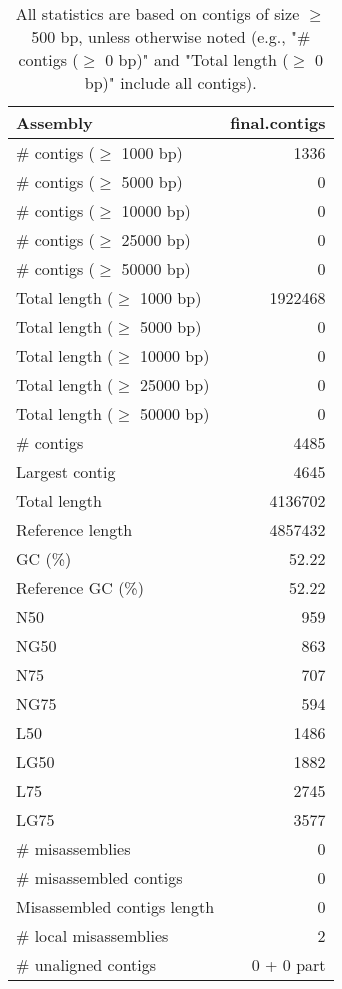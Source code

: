 \documentclass[12pt,a4paper]{article}
\begin{document}
\begin{table}[ht]
\begin{center}
\caption{All statistics are based on contigs of size $\geq$ 500 bp, unless otherwise noted (e.g., "\# contigs ($\geq$ 0 bp)" and "Total length ($\geq$ 0 bp)" include all contigs).}
\begin{tabular}{|l*{1}{|r}|}
\hline
Assembly & final.contigs \\ \hline
\# contigs ($\geq$ 1000 bp) & 1336 \\ \hline
\# contigs ($\geq$ 5000 bp) & 0 \\ \hline
\# contigs ($\geq$ 10000 bp) & 0 \\ \hline
\# contigs ($\geq$ 25000 bp) & 0 \\ \hline
\# contigs ($\geq$ 50000 bp) & 0 \\ \hline
Total length ($\geq$ 1000 bp) & 1922468 \\ \hline
Total length ($\geq$ 5000 bp) & 0 \\ \hline
Total length ($\geq$ 10000 bp) & 0 \\ \hline
Total length ($\geq$ 25000 bp) & 0 \\ \hline
Total length ($\geq$ 50000 bp) & 0 \\ \hline
\# contigs & 4485 \\ \hline
Largest contig & 4645 \\ \hline
Total length & 4136702 \\ \hline
Reference length & 4857432 \\ \hline
GC (\%) & 52.22 \\ \hline
Reference GC (\%) & 52.22 \\ \hline
N50 & 959 \\ \hline
NG50 & 863 \\ \hline
N75 & 707 \\ \hline
NG75 & 594 \\ \hline
L50 & 1486 \\ \hline
LG50 & 1882 \\ \hline
L75 & 2745 \\ \hline
LG75 & 3577 \\ \hline
\# misassemblies & 0 \\ \hline
\# misassembled contigs & 0 \\ \hline
Misassembled contigs length & 0 \\ \hline
\# local misassemblies & 2 \\ \hline
\# unaligned contigs & 0 + 0 part \\ \hline

\end{tabular}
\end{center}
\end{table}
\end{document}
